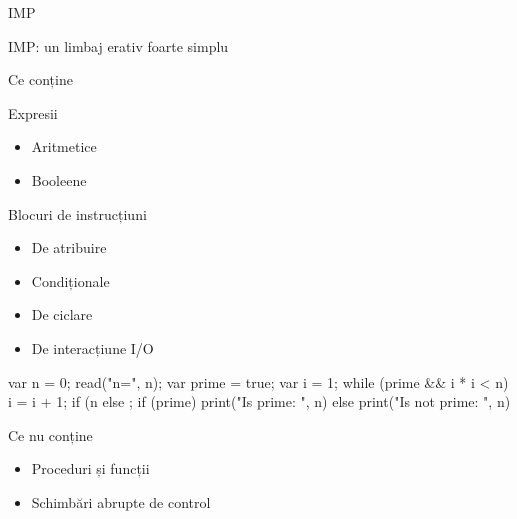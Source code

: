 \documentclass[xcolor=pdftex,romanian,colorlinks]{beamer}
\begin{document}
\begin{subsection}{IMP}
\begin{frame}[fragile]{IMP: un limbaj erativ foarte simplu}\ 
\begin{block}{Ce conține}
\begin{minipage}{.49\columnwidth}
\begin{itemize}
\vitem Expresii
\begin{itemize}
  \item Aritmetice %
  \item Booleene %
\end{itemize}
\vitem Blocuri de instrucțiuni
\begin{itemize}
  \item De atribuire %
  \item Condiționale %
  \item De ciclare   %
  \item De interacțiune I/O
\end{itemize}
\end{itemize}
\end{minipage}
\begin{minipage}{.49\columnwidth}
\begin{asciic}
  var n = 0; read("n=", n);
  var prime = true;
  var i = 1;
  while (prime && i * i < n) {
      i = i + 1;
      if (n %
      else {}
  };
  if (prime) print("Is prime: ", n)
  else print("Is not prime: ", n)  
\end{asciic}
\end{minipage}
\end{block}
\begin{block}{Ce nu conține}
\begin{itemize}
\item Proceduri și funcții
\item Schimbări abrupte de control
\end{itemize}
\end{block}
\end{frame}

\begin{comment}
 \begin{frame}{Sintaxă formală}{Backus Naur Form}
  \begin{itemize}
   \item Pentru gramatici (generative) independente de context
   \item Producții
       --- generează termeni prin expandare (rescriere)


\end{comment}
\end{subsection}
\end{document}
